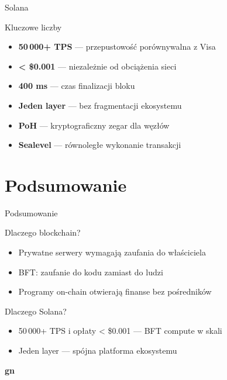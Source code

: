 \begin{frame}{Solana}
  \begin{block}{Kluczowe liczby}
    \begin{itemize}
      \item \textbf{50\,000+ TPS} --- przepustowość porównywalna z Visa
      \item \textbf{\textless{} \$0.001} --- niezależnie od obciążenia sieci
      \item \textbf{400 ms} --- czas finalizacji bloku
      \item \textbf{Jeden layer} --- bez fragmentacji ekosystemu
    \end{itemize}
  \end{block}
  \vspace{0.3cm}
  \begin{itemize}
    \item \textbf{PoH} --- kryptograficzny zegar dla węzłów
    \item \textbf{Sealevel} --- równoległe wykonanie transakcji
  \end{itemize}
\end{frame}

\section{Podsumowanie}

\begin{frame}{Podsumowanie}
  \begin{block}{Dlaczego blockchain?}
    \begin{itemize}
      \item Prywatne serwery wymagają zaufania do właściciela
      \item BFT: zaufanie do kodu zamiast do ludzi
      \item Programy on-chain otwierają finanse bez pośredników
    \end{itemize}
  \end{block}
  \vspace{0.4cm}
  \begin{block}{Dlaczego Solana?}
    \begin{itemize}
      \item 50\,000+ TPS i opłaty \textless{} \$0.001 --- BFT compute w skali
      \item Jeden layer --- spójna platforma ekosystemu
    \end{itemize}
  \end{block}
\end{frame}

\begin{frame}[plain]
  \begin{center}
    \vfill
    {\Huge\bfseries\color{stplwhite} gn}
    \vfill
  \end{center}
\end{frame}


